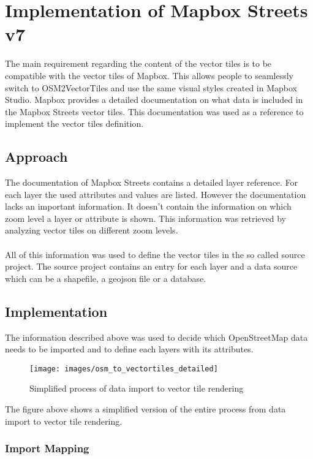 \chapter{Implementation of Mapbox Streets v7 }

The main requirement regarding the content of the vector tiles is to be compatible with the vector tiles of Mapbox. This allows people to seamlessly switch to OSM2VectorTiles and use the same visual styles created in Mapbox Studio. Mapbox provides a detailed documentation on what data is included in the Mapbox Streets vector tiles. This documentation was used as a reference to implement the vector tiles definition.

\section{Approach}

The documentation of Mapbox Streets contains a detailed layer reference. For each layer the used attributes and values are listed. However the documentation lacks an important information. It doesn't contain the information on which zoom level a layer or attribute is shown. This information was retrieved by analyzing vector tiles on different zoom levels.\\\\
All of this information was used to define the vector tiles in the so called source project. The source project contains an entry for each layer and a data source which can be a shapefile, a geojson file or a database. 

\section{Implementation}

The information described above was used to decide which OpenStreetMap data needs to be imported and to define each layers with its attributes. 

\begin{figure}[H]
\centering
\texttt{[image: images/osm\_to\_vectortiles\_detailed]}
\caption{Simplified process of data import to vector tile rendering}
\end{figure}

The figure above shows a simplified version of the entire process from data import to vector tile rendering. 

\subsection{Import Mapping}

